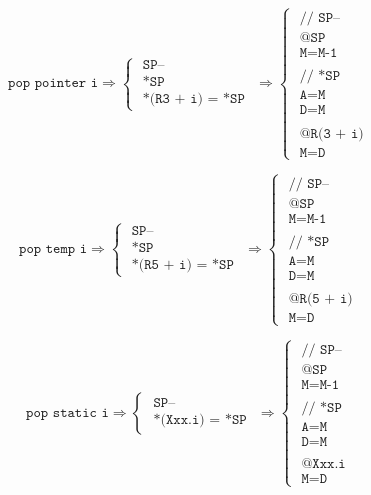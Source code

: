 \documentclass[a4paper]{book}
\begin{document}
\[
    \texttt{pop pointer i}
    \Rightarrow
    \begin{cases}
        \texttt{ SP--            } \\
        \texttt{ *SP             } \\
        \texttt{ *(R3 + i) = *SP }
    \end{cases}
    \Rightarrow
    \begin{cases}
        \texttt{ // SP--   } \\
        \texttt{ @SP       } \\
        \texttt{ M=M-1     } \\
        \\
        \texttt{ // *SP    } \\
        \texttt{ A=M       } \\
        \texttt{ D=M       } \\
        \\
        \texttt{ @R(3 + i) } \\
        \texttt{ M=D       }
    \end{cases}
\]

\[
    \texttt{pop temp i}
    \Rightarrow
    \begin{cases}
        \texttt{ SP--            } \\
        \texttt{ *SP             } \\
        \texttt{ *(R5 + i) = *SP }
    \end{cases}
    \Rightarrow
    \begin{cases}
        \texttt{ // SP--   } \\
        \texttt{ @SP       } \\
        \texttt{ M=M-1     } \\
        \\
        \texttt{ // *SP    } \\
        \texttt{ A=M       } \\
        \texttt{ D=M       } \\
        \\
        \texttt{ @R(5 + i) } \\
        \texttt{ M=D       }
    \end{cases}
\]

\[
    \texttt{pop static i}
    \Rightarrow
    \begin{cases}
        \texttt{ SP--            } \\
        \texttt{ *(Xxx.i) = *SP }
    \end{cases}
    \Rightarrow
    \begin{cases}
        \texttt{ // SP-- } \\
        \texttt{ @SP     } \\
        \texttt{ M=M-1   } \\
        \\
        \texttt{ // *SP  } \\
        \texttt{ A=M     } \\
        \texttt{ D=M     } \\
        \\
        \texttt{ @Xxx.i  } \\
        \texttt{ M=D     }
    \end{cases}
\]
\end{document}
